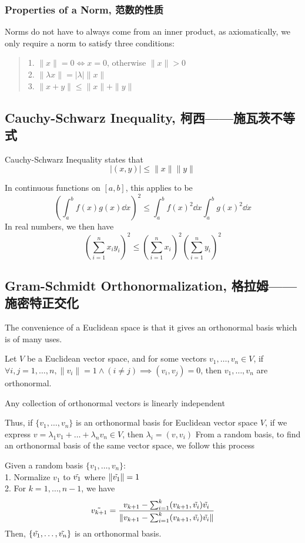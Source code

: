 \subsubsection{Properties of a Norm, 范数的性质}
Norms do not have to always come from an inner product, as axiomatically, we only require a norm to satisfy three conditions: 
\begin{quote}
    1. $\|x\| = 0 \iff x = 0$, otherwise $\|x\| > 0$ \\
    2. $\|\lambda x\| = |\lambda| \|x\|$ \\
    3. $\|x+y\| \le \|x\| + \|y\|$
\end{quote}

\subsection{Cauchy-Schwarz Inequality, 柯西——施瓦茨不等式}
\begin{theorem}
    Cauchy-Schwarz Inequality states that
    $$|(x, y)| \le \|x\| \|y\|$$
\end{theorem}
In continuous functions on $[a, b]$, this applies to be
$$(\int_a^b f(x)g(x) \dd x)^2 \le \int_a^b f(x)^2 \dd x \int_a^b g(x)^2 \dd x$$
In real numbers, we then have
$$(\sum_{i=1}^n x_iy_i)^2 \le (\sum_{i=1}^n x_i)^2 (\sum_{i=1}^n y_i)^2$$
\subsection{Gram-Schmidt Orthonormalization, 格拉姆——施密特正交化}
The convenience of a Euclidean space is that it gives an orthonormal basis which is of many uses.
\begin{definition}
    Let $V$ be a Euclidean vector space, and for some vectors $v_1, \dots, v_n \in V$, if $\forall i, j = 1, \dots, n, \|v_i\| = 1 \land (i \ne j) \implies (v_i, v_j) = 0$, then $v_1, \dots, v_n$ are orthonormal.
\end{definition}
\begin{lemma}
    Any collection of orthonormal vectors is linearly independent
\end{lemma}
Thus, if $\{v_1, \dots, v_n\}$ is an orthonormal basis for Euclidean vector space $V$, if we express $v = \lambda_1v_1 + \dots + \lambda_n v_n \in V$, then $\lambda_i = (v, v_i)$
From a random basis, to find an orthonormal basis of the same vector space, we follow this process
\begin{theorem}
    Given a random basis $\{v_1, \dots, v_n\}$: \\
    1. Normalize $v_1$ to $\Tilde{v_1}$ where $\|\Tilde{v_1}\| = 1$ \\
    2. For $k = 1, \dots, n-1$, we have
    $$\Tilde{v_{k+1}} = \frac{v_{k+1} - \sum_{i=1}^k(v_{k+1}, \Tilde{v_i})\Tilde{v_i}}{\|v_{k+1} - \sum_{i=1}^k(v_{k+1}, \Tilde{v_i})\Tilde{v_i}\|}$$
    Then, $\{\Tilde{v_1}, \dots, \Tilde{v_n}\}$ is an orthonormal basis.
\end{theorem}

